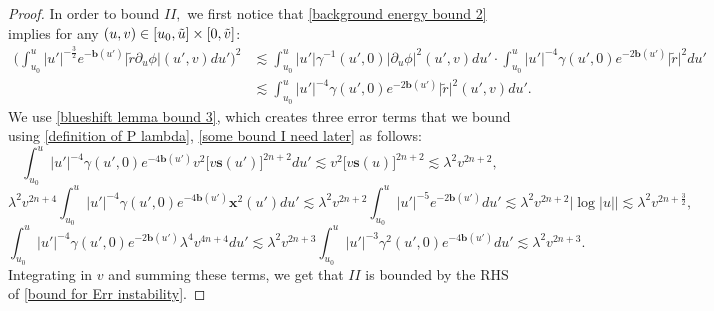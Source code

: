 \documentclass[11pt]{article}
\numberwithin{equation}{section}
\begin{document}
\begin{proof}
    In order to bound $II,$ we first notice that \eqref{background energy bound 2} implies for any $(u,v)\in[u_0,\Tilde{u}]\times[0,\Tilde{v}]$:
    \begin{align*}
        \bigg(\int_{u_0}^u|u'|^{-\frac{3}{2}}e^{-\mathbf{b}(u')}\big|\widetilde{r}\partial_u\phi\big|(u',v)du'\bigg)^2&\lesssim\int_{u_0}^u|u'|\gamma^{-1}(u',0)\big|\partial_u\phi\big|^2(u',v)du'\cdot\int_{u_0}^u|u'|^{-4}\gamma(u',0)e^{-2\mathbf{b}(u')}\big|\widetilde{r}\big|^2du'\\
        &\lesssim\int_{u_0}^u|u'|^{-4}\gamma(u',0)e^{-2\mathbf{b}(u')}\big|\widetilde{r}\big|^2(u',v)du'.
    \end{align*}
    We use \eqref{blueshift lemma bound 3}, which creates three error terms that we bound using \eqref{definition of P lambda}, \eqref{some bound I need later} as follows:
    \[\int_{u_0}^u|u'|^{-4}\gamma(u',0)e^{-4\mathbf{b}(u')}v^2\big[v\mathbf{s}(u')\big]^{2n+2}du'\lesssim v^2\big[v\mathbf{s}(u)\big]^{2n+2}\lesssim\lambda^2v^{2n+2},\]
    \[\lambda^2v^{2n+4}\int_{u_0}^u|u'|^{-4}\gamma(u',0)e^{-4\mathbf{b}(u')}\mathbf{x}^2(u')du'\lesssim\lambda^2v^{2n+2}\int_{u_0}^u|u'|^{-5}e^{-2\mathbf{b}(u')}du'\lesssim\lambda^2v^{2n+2}\big|\log|u|\big|\lesssim\lambda^2v^{2n+\frac{3}{2}},\]
    \[\int_{u_0}^u|u'|^{-4}\gamma(u',0)e^{-2\mathbf{b}(u')}\lambda^4v^{4n+4}du'\lesssim\lambda^2v^{2n+3}\int_{u_0}^u|u'|^{-3}\gamma^2(u',0)e^{-4\mathbf{b}(u')}du'\lesssim\lambda^2v^{2n+3}.\]
    Integrating in $v$ and summing these terms, we get that $II$ is bounded by the RHS of \eqref{bound for Err instability}.


\end{proof}
\end{document}
